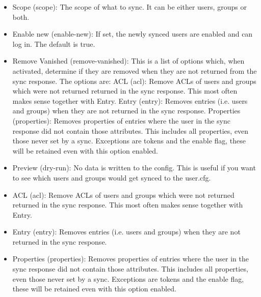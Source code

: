 \begin{itemize}[leftmargin=2cm]

	\item Scope (scope): The scope of what to sync. It can be either users, groups or both.

	\item Enable new (enable-new): If set, the newly synced users are enabled and can log in. The default is true.

	\item Remove Vanished (remove-vanished): This is a list of options which, when activated, determine if they are removed when they are not returned from the sync response. The options are: ACL (acl): Remove ACLs of users and groups which were not returned returned in the sync response. This most often makes sense together with Entry. Entry (entry): Removes entries (i.e. users and groups) when they are not returned in the sync response. Properties (properties): Removes properties of entries where the user in the sync response did not contain those attributes. This includes all properties, even those never set by a sync. Exceptions are tokens and the enable flag, these will be retained even with this option enabled.

	\item Preview (dry-run): No data is written to the config. This is useful if you want to see which users and groups would get synced to the user.cfg.

\end{itemize}

\begin{itemize}[leftmargin=2cm]

	\item ACL (acl): Remove ACLs of users and groups which were not returned returned in the sync response. This most often makes sense together with Entry.

	\item Entry (entry): Removes entries (i.e. users and groups) when they are not returned in the sync response.

	\item Properties (properties): Removes properties of entries where the user in the sync response did not contain those attributes. This includes all properties, even those never set by a sync. Exceptions are tokens and the enable flag, these will be retained even with this option enabled.

\end{itemize}

